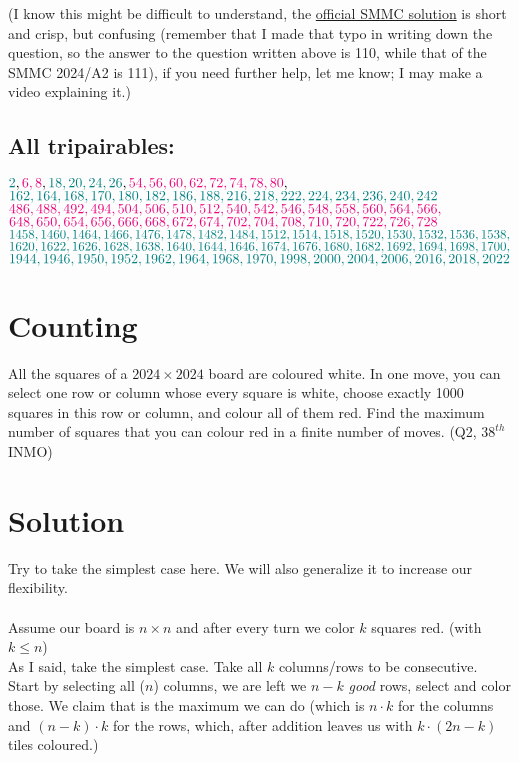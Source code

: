 \documentclass[12pt, letterpaper]{article}
\begin{document}
(I know this might be difficult to understand, the \href{https://www.simonmarais.org/uploads/8/2/3/5/82358688/smmc_2024_solutions.pdf}{\color{orange}official SMMC solution} is short and crisp, but confusing (remember that I made that typo in writing down the question, so the answer to the question written above is 110, while that of the SMMC 2024/A2 is 111), if you need further help, let me know; I may make a video explaining it.)

\subsection{All tripairables:}
${\color{teal}2}, {\color{RubineRed}6, 8}, {\color{teal}18, 20, 24, 26}, {\color{RubineRed}54, 56, 60, 62, 72, 74, 78, 80},$ \\${\color{teal}162, 164, 168, 170, 180, 182, 186, 188, 216, 218, 222, 224, 234, 236, 240, 242}$\\$\color{RubineRed}486, 488, 492, 494, 504, 506, 510, 512, 540, 542, 546, 548, 558, 560, 564, 566,$\\$
{\color{RubineRed}648, 650, 654, 656, 666, 668, 672, 674, 702, 704, 708, 710, 720, 722, 726, 728}$\\
${\color{teal}1458, 1460, 1464, 1466, 1476, 1478, 1482, 1484, 1512, 1514, 1518, 1520, 1530, 1532, 1536, 1538,}$\\$\color{teal}
1620, 1622, 1626, 1628, 1638, 1640, 1644, 1646, 1674, 1676, 1680, 1682, 1692, 1694, 1698, 1700,$\\$\color{teal}
1944, 1946, 1950, 1952, 1962, 1964, 1968, 1970, 1998, 2000, 2004, 2006, 2016, 2018, 2022$\\{\color{teal}\sout{}}
\newpage


\section{Counting}
All the squares of a \( 2024 \times 2024 \) board are coloured white. In one move, you can select one row or column whose every square is white, choose exactly 1000 squares in this row or column, and colour all of them red. Find the maximum number of squares that you can colour red in a finite number of moves. {\color{gray} (Q2, $38^{th}$ INMO)}

\section*{Solution}
\colorbox{Dandelion}{Try to take the simplest case here. We will also generalize it to increase our flexibility.}\\\\
Assume our board is $n \times n$ and after every turn we color $k$ squares red. (with $k \leq n$)\\
As I said, take the simplest case. Take all $k$ columns/rows to be consecutive. Start by selecting all ($n$) columns, we are left we $n-k$ \emph{good} rows, select and color those. We claim that is the maximum we can do (which is $n\cdot k$ for the columns and $(n-k)\cdot k$ for the rows, which, after addition leaves us with $k\cdot (2n-k)$ tiles coloured.)
\end{document}
